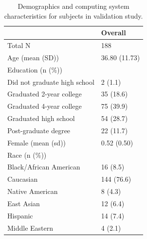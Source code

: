 \documentclass[]{article}
\begin{document}
\begin{table}[H]
\centering
\caption{\label{tb:subject_characteristics}Demographics and computing system characteristics for subjects in validation study.}
\begin{tabular}{@{}ll@{}}
\toprule
                                                          & Overall       \\ \midrule
Total N                                                   & 188           \\
Age (mean (SD))                                           & 36.80 (11.73) \\
Education (n (\%))                                             &               \\
\hspace{6mm}Did not graduate high school & 2 (1.1)       \\
\hspace{6mm}Graduated 2-year college     & 35 (18.6)     \\
\hspace{6mm}Graduated 4-year college     & 75 (39.9)     \\
\hspace{6mm}Graduated high school        & 54 (28.7)     \\
\hspace{6mm}Post-graduate degree         & 22 (11.7)     \\
Female (mean (sd))                                        & 0.52 (0.50)   \\
Race (n (\%))                                             &               \\
\hspace{6mm}Black/African American                        & 16 (8.5)      \\
\hspace{6mm}Caucasian                                    & 144 (76.6)    \\
\hspace{6mm}Native American                              & 8 (4.3)       \\
\hspace{6mm}East Asian                                    & 12 (6.4)      \\
\hspace{6mm}Hispanic                                      & 14 (7.4)      \\
\hspace{6mm}Middle Eastern                                & 4 (2.1)       \\

\end{tabular}
\end{table}
\end{document}
